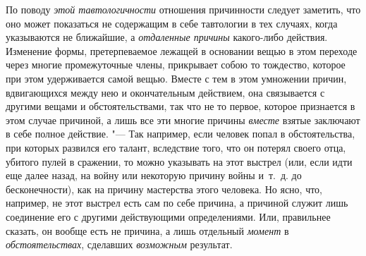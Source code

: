 По поводу {\em этой тавтологичности} отношения причинности следует заметить,
что оно может показаться не содержащим в себе тавтологии в тех случаях, когда
указываются не ближайшие, а {\em отдаленные причины} какого-либо действия.
Изменение формы, претерпеваемое лежащей в основании вещью в этом переходе через
многие промежуточные члены, прикрывает собою то тождество, которое при этом
удерживается самой вещью. Вместе с тем в этом умножении причин, вдвигающихся
между нею и окончательным действием, она связывается с другими вещами и
обстоятельствами, так что не то первое, которое признается в этом случае
причиной, а лишь все эти многие причины {\em вместе} взятые заключают в себе
полное действие. "--- Так например, если человек попал в обстоятельства, при
которых развился его талант, вследствие того, что он потерял своего отца,
убитого пулей в сражении, то можно указывать на этот выстрел (или, если идти
еще далее назад, на войну или некоторую причину войны и~т.~д. до
бесконечности), как на причину мастерства этого человека. Но ясно, что,
например, не этот выстрел есть сам по себе причина, а причиной служит лишь
соединение его с другими действующими определениями. Или, правильнее сказать,
он вообще есть не причина, а лишь отдельный {\em момент} в~{\em
обстоятельствах}, сделавших {\em возможным} результат.

